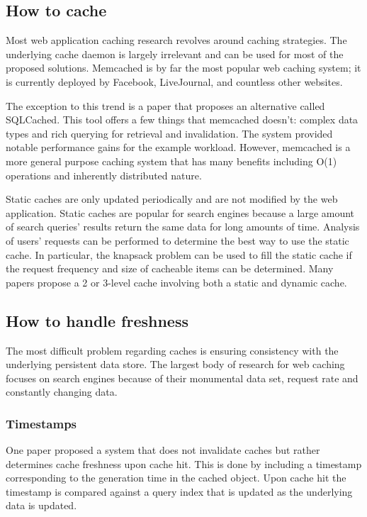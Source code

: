 \documentclass[12pt]{article}
\begin{document}
\subsection{How to cache}
Most web application caching research revolves around caching strategies.
The underlying cache daemon is largely irrelevant and can be used for most of the proposed solutions.
Memcached is by far the most popular web caching system; it is currently deployed by Facebook, LiveJournal, and countless other websites.

The exception to this trend is a paper that proposes an alternative called SQLCached. \cite{sqlCached}
This tool offers a few things that memcached doesn't: complex data types and rich querying for retrieval and invalidation.
The system provided notable performance gains for the example workload.
However, memcached is a more general purpose caching system that has many benefits including O(1) operations and inherently distributed nature.

Static caches are only updated periodically and are not modified by the web application.
Static caches are popular for search engines because a large amount of search queries' results return the same data for long amounts of time.
Analysis of users' requests can be performed to determine the best way to use the static cache.
In particular, the knapsack problem can be used to fill the static cache if the request frequency and size of cacheable items can be determined. \cite{designTradeOffsSearchEngine}
Many papers propose a 2 or 3-level cache involving both a static and dynamic cache. \cite{cacheAdmissionPolicies} \cite{designTradeOffsSearchEngine}

\subsection{How to handle freshness}
The most difficult problem regarding caches is ensuring consistency with the underlying persistent data store.
The largest body of research for web caching focuses on search engines because of their monumental data set, request rate and constantly changing data.

\subsubsection{Timestamps}
One paper proposed a system that does not invalidate caches but rather determines cache freshness upon cache hit. \cite{cacheInvalidationWebSearch}
This is done by including a timestamp corresponding to the generation time in the cached object.
Upon cache hit the timestamp is compared against a query index that is updated as the underlying data is updated.
\end{document}

